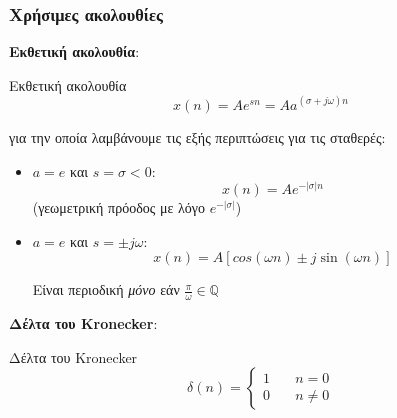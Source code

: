\documentclass[11pt,a4paper,notitlepage,fleqn]{article}
\begin{document}
\pagebreak[3]

\subsubsection{Χρήσιμες ακολουθίες}
\begin{enumpar}
	\item \textbf{Εκθετική ακολουθία}:

	\begin{minipage}{.5\textwidth}
		\begin{knowledgebox}{Εκθετική ακολουθία}
		\[ \displaystyle
		x(n) = Ae^{sn} = Aa^{(\sigma + j \omega )n}
		\]
		\end{knowledgebox}

		για την οποία λαμβάνουμε τις εξής περιπτώσεις για τις σταθερές:
		\begin{itemize}
			\item \( a=e \) και \( s = \sigma < 0 \):
			\[
			x(n) = Ae^{-|σ|n}
			\]
			(γεωμετρική πρόοδος με λόγο \( e^{-|σ|} \))
			\item \( a=e \) και \( s = \pm j\omega  \):
			\[
			x(n) = A\left[
			cos(\omega n) \pm j \sin(\omega n)
			\right]
			\]
			
			Είναι περιοδική \textit{μόνο} εάν \( \frac{\pi}{\omega } \in \mathbb Q \)
		\end{itemize}
	\end{minipage}
	\begin{minipage}{.5\textwidth}
	\end{minipage}
    \item \textbf{Δέλτα του Kronecker}:

    \begin{minipage}{.5\textwidth}
    	\begin{knowledgebox}{Δέλτα του Kronecker}
    		\[ \displaystyle
    		\delta(n) = \begin{cases}
    		1 &\quad n=0\\
    		0 &\quad n\neq 0
    		\end{cases}
    		\]
    	\end{knowledgebox}
    \end{minipage}
	\begin{minipage}{.5\textwidth}
\end{minipage}
\end{enumpar}
\end{document}
